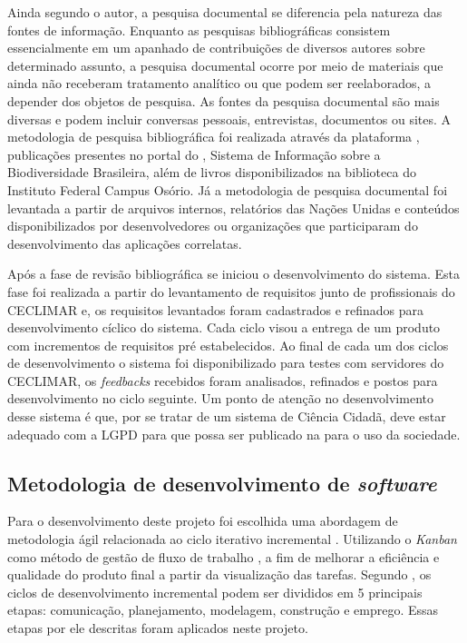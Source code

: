 Ainda segundo o autor, a pesquisa documental se diferencia pela natureza das fontes de informação. Enquanto as 
pesquisas bibliográficas consistem essencialmente em um apanhado de contribuições de diversos autores sobre 
determinado assunto, a pesquisa documental ocorre por meio de materiais que ainda não receberam tratamento 
analítico ou que podem ser reelaborados, a depender dos objetos de pesquisa. As fontes da pesquisa documental 
são mais diversas e podem incluir conversas pessoais, entrevistas, documentos ou sites.
A metodologia de pesquisa bibliográfica foi realizada através da plataforma , publicações presentes no portal do , Sistema de Informação sobre a Biodiversidade Brasileira, além de livros disponibilizados na biblioteca do Instituto Federal Campus Osório. Já a metodologia de pesquisa documental foi levantada a partir de arquivos internos, relatórios das Nações Unidas e conteúdos disponibilizados por desenvolvedores ou organizações que participaram do desenvolvimento das aplicações correlatas.

Após a fase de revisão bibliográfica se iniciou o desenvolvimento do sistema. Esta fase foi realizada a 
partir do levantamento de requisitos junto de profissionais do CECLIMAR e, os requisitos levantados foram 
cadastrados e refinados para desenvolvimento cíclico do sistema. Cada ciclo visou a entrega de um produto 
com incrementos de requisitos pré estabelecidos. Ao final de cada um dos ciclos de desenvolvimento o sistema 
foi disponibilizado para testes com servidores do CECLIMAR, os \textit{feedbacks} recebidos foram analisados, 
refinados e postos para desenvolvimento no ciclo seguinte. Um ponto de atenção no desenvolvimento desse 
sistema é que, por se tratar de um sistema de Ciência Cidadã, deve estar adequado com a LGPD para que possa 
ser publicado na  para o uso da sociedade.

\subsection{Metodologia de desenvolvimento de \textit{software}}\label{sec:metodologia-desenv-software}
Para o desenvolvimento deste projeto foi escolhida uma abordagem de metodologia ágil relacionada 
ao ciclo iterativo incremental \cite{pressman2011engenharia}. Utilizando o \textit{Kanban} como 
método de gestão de fluxo de trabalho \cite{ohno1988toyota}, a fim de melhorar a eficiência e qualidade do produto 
final a partir da visualização das tarefas. 
Segundo , os ciclos de desenvolvimento incremental podem ser 
divididos em 5 principais etapas: comunicação, planejamento, modelagem, construção 
 e emprego. Essas etapas por ele descritas foram 
aplicados neste projeto. 

